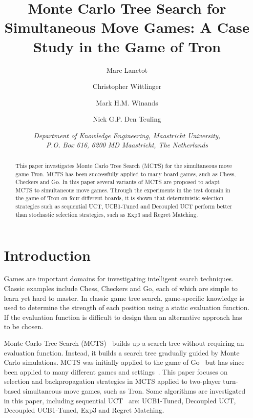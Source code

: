 \documentclass{article}
\title{\textbf{\huge Monte Carlo Tree Search for Simultaneous Move Games: A Case Study in the Game of Tron}}
\author{
    Marc Lanctot\and 
    Christopher Wittlinger \and
    Mark H.M. Winands \and
    Niek G.P. Den Teuling}
\date{\textit{Department of Knowledge Engineering, Maastricht University,\\ P.O. Box 616, 6200 MD Maastricht, The Netherlands}}
\begin{document}
\ttl
\thispagestyle{empty}



\begin{abstract}
\noindent This paper investigates Monte Carlo Tree Search (MCTS) for the simultaneous move game Tron. MCTS has been successfully applied to many board games, such as Chess, Checkers and Go. In this paper several variants of MCTS are proposed to adapt MCTS to simultaneous move games. Through the experiments in the test domain in the game of Tron on four different boards, it is shown that deterministic selection strategies such as sequential UCT, UCB1-Tuned and Decoupled UCT perform better than stochastic selection strategies, such as Exp3 and Regret Matching.
\end{abstract}

\section{Introduction}
\label{sec:introduction}
Games are important domains for investigating intelligent search techniques.
Classic examples include Chess, Checkers and Go, each of which are simple to learn yet hard to master.
In classic game tree search, game-specific knowledge is used to determine the strength of each position using a static evaluation function. %
If the evaluation function is difficult to design then an alternative approach has to be chosen. 

Monte Carlo Tree Search (MCTS)~\cite{chaslot_phd,coulom,kocsis} builds up a search tree without requiring an evaluation function. Instead, it builds a search tree gradually guided by Monte Carlo simulations. MCTS was initially applied to the game of Go~\cite{coulom} but has since been applied to many different games and settings~\cite{mctssurvey}. This paper focuses on selection and backpropagation strategies in MCTS applied to two-player turn-based simultaneous move games, such as Tron. Some algorithms are investigated in this paper, including sequential UCT~\cite{kocsis} are: UCB1-Tuned, Decoupled UCT, Decoupled UCB1-Tuned, Exp3 and Regret Matching.
\end{document}
